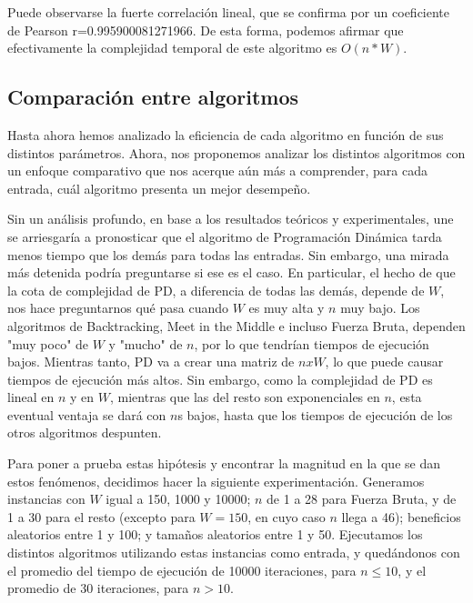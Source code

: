 \documentclass[a4paper]{article}
\begin{document}
Puede observarse la fuerte correlación lineal, que se confirma por un coeficiente de Pearson r=0.995900081271966. De esta forma, podemos afirmar que efectivamente la complejidad temporal de este algoritmo es $O(n*W)$. 


\subsection{Comparación entre algoritmos}

Hasta ahora hemos analizado la eficiencia de cada algoritmo en función de sus distintos parámetros. Ahora, nos proponemos analizar los distintos algoritmos con un enfoque comparativo que nos acerque aún más a comprender, para cada entrada, cuál algoritmo presenta un mejor desempeño. 

Sin un análisis profundo, en base a los resultados teóricos y experimentales, une se arriesgaría a pronosticar que el algoritmo de Programación Dinámica tarda menos tiempo que los demás para todas las entradas. Sin embargo, una mirada más detenida podría preguntarse si ese es el caso. En particular, el hecho de que la cota de complejidad de PD, a diferencia de todas las demás, depende de $W$, nos hace preguntarnos qué pasa cuando $W$ es muy alta y $n$ muy bajo. Los algoritmos de Backtracking, Meet in the Middle e incluso Fuerza Bruta, dependen "muy poco" de $W$ y "mucho" de $n$, por lo que tendrían tiempos de ejecución bajos. Mientras tanto, PD va a crear una matriz de $nxW$, lo que puede causar tiempos de ejecución más altos. Sin embargo, como la complejidad de PD es lineal en $n$ y en $W$, mientras que las del resto son exponenciales en $n$, esta eventual ventaja se dará con $n$s bajos, hasta que los tiempos de ejecución de los otros algoritmos despunten. 

Para poner a prueba estas hipótesis y encontrar la magnitud en la que se dan estos fenómenos, decidimos hacer la siguiente experimentación. Generamos instancias con  $W$ igual a  150, 1000 y 10000; $n$ de 1 a 28 para Fuerza Bruta, y de 1 a 30 para el resto (excepto para $W = 150$, en cuyo caso $n$ llega a 46); beneficios aleatorios entre 1 y 100; y tamaños aleatorios entre 1 y 50. Ejecutamos los distintos algoritmos utilizando estas instancias como entrada, y quedándonos con el promedio del tiempo de ejecución de 10000 iteraciones, para $n \leq 10$, y el promedio de 30 iteraciones, para $n > 10$.
\end{document}
